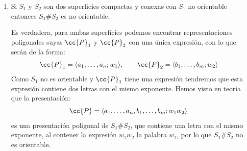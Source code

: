 \documentclass[12pt]{article}
\begin{document}
\begin{ejercicio}
\begin{enumerate}[label=\alph*)]
                Es falsa, si consideramos $X= \mathbb{R}^2$ tenemos que $X$ admite un recubridor universal (él mismo con la aplicación identidad). Si denotamos ahora por $S(x,r)$ a la circunferencia de centro $x$ y radio $r$ y consideramos:
                \begin{equation*}
                    Y = \bigcup_{n\in \mathbb{N}}S\left(\frac{1}{n},\frac{1}{n}\right)
                \end{equation*}
                \begin{figure}[H]
                    \centering
                    \caption{Conjunto $Y$.}
                \end{figure}
                Tenemos que $Y$ es arcoconexo como la unión de conjunto arcoconexos que se interseca en un punto (en el punto $(0,0)$) y que $Y$ no es semilocalmente simplemente conexo, pues para $x_0 = (0,0)$ todo entorno $U$ de $x_0$ ha de contener alguna circunferencia de radio $\nicefrac{1}{n}$, y el arco cuya imagen rodea dicha circunferencia no puede cerrarse en $U$ pero sí en $X$, por lo que $(i_U)_\ast$ no es trivial, lo que prueba que $Y$ no es semilocalmente simplemente conexo, luego no puede tener recubridor universal.
            \item Si $S_1$ y $S_2$ son dos superficies compactas y conexas con $S_1$ no orientable entonces $S_1\#S_2$ es no orientable. 

                Es verdadera, para ambas superficies podemos encontrar representaciones poligonales suyas $\cc{P}_1$ y $\cc{P}_2$ con una única expresión, con lo que serán de la forma:
                \begin{equation*}
                    \cc{P}_1 = \langle a_1,\ldots,a_n;w_1 \rangle , \qquad \cc{P}_2 = \langle b_1,\ldots,b_m;w_2 \rangle 
                \end{equation*}
                Como $S_1$ no es orientable y $\cc{P}_1$ tiene una expresión tendremos que esta expresión contiene dos letras con el mismo exponente. Hemos visto en teoría que la presentación:
                \begin{equation*}
                    \cc{P} = \langle a_1,\ldots,a_n,b_1,\ldots,b_m;w_1w_2 \rangle 
                \end{equation*}
                es una presentación poligonal de $S_1\# S_2$, que contiene una letra con el mismo exponente, al contener la expresión $w_1w_2$ la palabra $w_1$, por lo que $S_1\# S_2$ no es orientable.
        \end{enumerate}
    \end{ejercicio}
\end{document}
